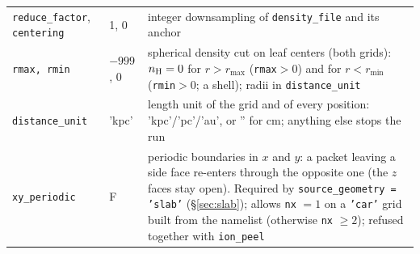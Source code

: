 \documentclass[english,a4paper]{my_memo}
\newcommand{\code}[1]{\texttt{#1}}
\begin{document}
{\begin{longtable}{llp{7.2cm}}
\code{reduce\_factor}, \code{centering} & 1, 0 & integer downsampling of \code{density\_file} and its anchor \\
\code{rmax, rmin} & $-999$, 0 & spherical density cut on leaf centers (both grids): $n_{\rm H}=0$ for $r>r_{\max}$ (\code{rmax}$>0$) and for $r<r_{\min}$ (\code{rmin}$>0$; a shell); radii in \code{distance\_unit} \\
\code{distance\_unit} & 'kpc' & length unit of the grid and of every position: 'kpc'/'pc'/'au', or '' for cm; anything else stops the run \\
\code{xy\_periodic} & F & periodic boundaries in $x$ and $y$: a packet leaving a side face re-enters through the opposite one (the $z$ faces stay open).  Required by \code{source\_geometry = 'slab'} (\S\ref{sec:slab}); allows \code{nx} $=1$ on a \code{'car'} grid built from the namelist (otherwise \code{nx} $\ge 2$); refused together with \code{ion\_peel} \\
\end{longtable}
}
\end{document}
